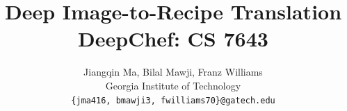 \documentclass[10pt,twocolumn,letterpaper]{article}
\begin{document}
\title{Deep Image-to-Recipe Translation\\
DeepChef: CS 7643}


\author{Jiangqin Ma, Bilal Mawji, Franz Williams\\
Georgia Institute of Technology\\
{\tt\small \{jma416, bmawji3, fwilliams70\}@gatech.edu}
}


\maketitle
\end{document}
